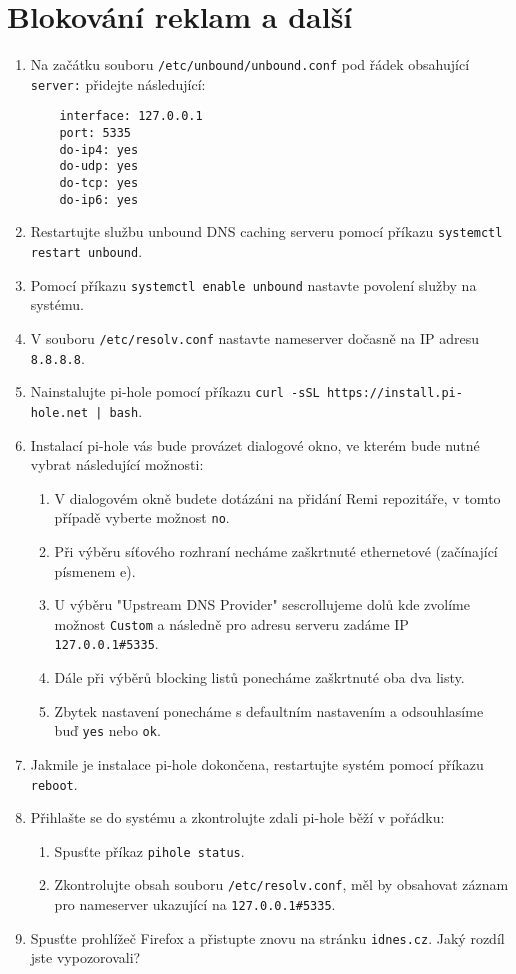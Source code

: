 \section{Blokování reklam a další}
\begin{enumerate}
    \item Na začátku souboru \texttt{/etc/unbound/unbound.conf} pod řádek obsahující \texttt{server:} přidejte následující:
\begin{verbatim}
    interface: 127.0.0.1
    port: 5335
    do-ip4: yes
    do-udp: yes
    do-tcp: yes
    do-ip6: yes
\end{verbatim}
    \item Restartujte službu unbound DNS caching serveru pomocí příkazu \texttt{systemctl restart unbound}.
    \item Pomocí příkazu \texttt{systemctl enable unbound} nastavte povolení služby na systému.
    \item V souboru \texttt{/etc/resolv.conf} nastavte nameserver dočasně na IP adresu \texttt{8.8.8.8}.
    \item Nainstalujte pi-hole pomocí příkazu \texttt{curl -sSL https://install.pi-hole.net | bash}.
    \item Instalací pi-hole vás bude provázet dialogové okno, ve kterém bude nutné vybrat následující možnosti:
    \begin{enumerate}
        \item V dialogovém okně budete dotázáni na přidání Remi repozitáře, v tomto případě vyberte možnost \texttt{no}.
        \item Při výběru síťového rozhraní necháme zaškrtnuté ethernetové (začínající písmenem e).
        \item U výběru "Upstream DNS Provider" sescrollujeme dolů kde zvolíme možnost \texttt{Custom} a následně pro adresu serveru zadáme IP \texttt{127.0.0.1\#5335}.
        \item Dále při výběrů blocking listů ponecháme zaškrtnuté oba dva listy.
        \item Zbytek nastavení ponecháme s defaultním nastavením a odsouhlasíme buď \texttt{yes} nebo \texttt{ok}.
    \end{enumerate}
    \item Jakmile je instalace pi-hole dokončena, restartujte systém pomocí příkazu \texttt{reboot}.
    \item Přihlašte se do systému a zkontrolujte zdali pi-hole běží v pořádku:
    \begin{enumerate}
        \item Spusťte příkaz \texttt{pihole status}.
        \item Zkontrolujte obsah souboru \texttt{/etc/resolv.conf}, měl by obsahovat záznam pro nameserver ukazující na \texttt{127.0.0.1\#5335}.
    \end{enumerate}
    \item Spusťte prohlížeč Firefox a přistupte znovu na stránku \texttt{idnes.cz}. Jaký rozdíl jste vypozorovali?
\end{enumerate}

